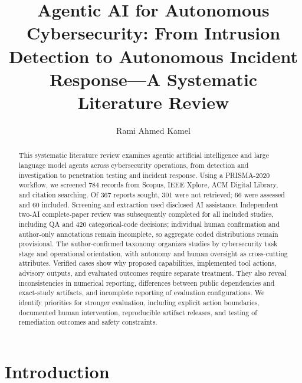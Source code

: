 \documentclass[manuscript,screen]{acmart}
\begin{document}
\title{Agentic AI for Autonomous Cybersecurity: From Intrusion Detection to Autonomous Incident Response---A Systematic Literature Review}

\author{Rami Ahmed Kamel}

\begin{abstract}
This systematic literature review examines agentic artificial intelligence and large language model agents across cybersecurity operations, from detection and investigation to penetration testing and incident response. Using a PRISMA-2020 workflow, we screened 784 records from Scopus, IEEE Xplore, ACM Digital Library, and citation searching. Of 367 reports sought, 301 were not retrieved; 66 were assessed and 60 included. Screening and extraction used disclosed AI assistance. Independent two-AI complete-paper review was subsequently completed for all included studies, including QA and 420 categorical-code decisions; individual human confirmation and author-only annotations remain incomplete, so aggregate coded distributions remain provisional. The author-confirmed taxonomy organizes studies by cybersecurity task stage and operational orientation, with autonomy and human oversight as cross-cutting attributes. Verified cases show why proposed capabilities, implemented tool actions, advisory outputs, and evaluated outcomes require separate treatment. They also reveal inconsistencies in numerical reporting, differences between public dependencies and exact-study artifacts, and incomplete reporting of evaluation configurations. We identify priorities for stronger evaluation, including explicit action boundaries, documented human intervention, reproducible artifact releases, and testing of remediation outcomes and safety constraints.
\end{abstract}



\maketitle

\section{Introduction}\label{sec:introduction}

\end{document}
